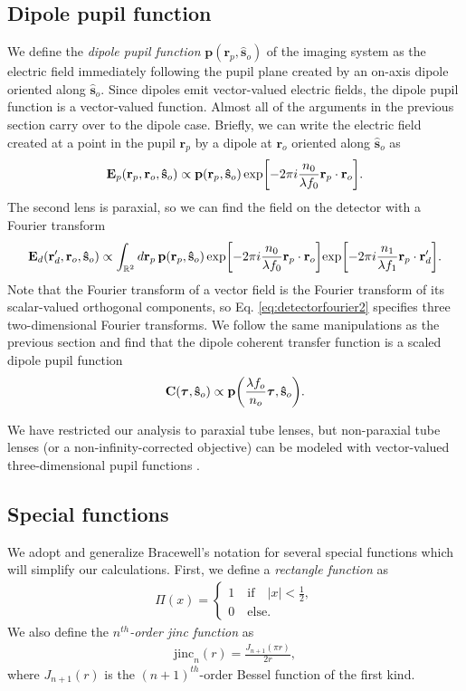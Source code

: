 \documentclass[]{osa-article}
\let\originalleft\left
\let\originalright\right
\renewcommand{\left}{\mathopen{}\mathclose\bgroup\originalleft}
\renewcommand{\right}{\aftergroup\egroup\originalright}
\providecommand{\mb}[1]{\mathbf{#1}}
\providecommand{\ro}{\mathbf{\mathbf{r}}_o}
\providecommand{\so}{\mathbf{\hat{s}}_o}
\providecommand{\rp}{\mathbf{r}_p}
\providecommand{\rd}{\mathbf{r}_d}
\providecommand{\mbb}[1]{\mathbb{#1}}
\providecommand{\bs}[1]{\boldsymbol{#1}}
\providecommand{\taup}{\bs{\tau}}
\begin{document}
\subsection{Dipole pupil function}
We define the \textit{dipole pupil function} $\mb{p}(\rp, \so)$ of the imaging
system as the electric field immediately following the pupil plane created by
an on-axis dipole oriented along $\so$. Since dipoles emit vector-valued
electric fields, the dipole pupil function is a vector-valued function. Almost
all of the arguments in the previous section carry over to the dipole case.
Briefly, we can write the electric field created at a point in the pupil
$\rp$ by a dipole at $\ro$ oriented along $\so$ as
 \begin{align}
   \mb{E}_p(\rp, \ro, \so) \propto \mb{p}(\rp, \so)\,\text{exp}\left[-2\pi i \frac{n_0}{\lambda f_0} \rp\cdot\ro \right]. \label{eq:pupil2}
 \end{align}
 The second lens is paraxial, so we can find the field on the detector with a
 Fourier transform
 \begin{align}
   \mb{E}_d(\rd', \ro, \so) \propto \int_{\mbb{R}^2}d\rp\, \mb{p}(\rp, \so)\,\text{exp}\left[-2\pi i \frac{n_0}{\lambda f_0} \rp\cdot\ro \right]\text{exp}\left[-2\pi i \frac{n_1}{\lambda f_1} \rp\cdot\rd' \right]. \label{eq:detectorfourier2}
\end{align}
Note that the Fourier transform of a vector field is the Fourier transform of
its scalar-valued orthogonal components, so Eq. \eqref{eq:detectorfourier2}
specifies three two-dimensional Fourier transforms. We follow the same
manipulations as the previous section and find that the dipole coherent transfer
function is a scaled dipole pupil function
\begin{align}
  \mb{C}(\taup, \so) \propto \mb{p}\left(\frac{\lambda f_o}{n_o}\taup, \so\right). \label{eq:monopupildip}
\end{align}

We have restricted our analysis to paraxial tube lenses, but non-paraxial tube
lenses (or a non-infinity-corrected objective) can be modeled with vector-valued
three-dimensional pupil functions \cite{sheppard1994, gu2000, arnison2002,
  foreman2011-2}.

\subsection{Special functions}
We adopt and generalize Bracewell's notation \cite{bracewell2004} for several
special functions which will simplify our calculations. First, we define a
\textit{rectangle function} as
\begin{align}
  \Pi(x) = 
  \begin{cases}
    1\quad \text{if}\quad |x| < \frac{1}{2},\\
    0\quad \text{else}.
  \end{cases}
\end{align}
We also define the \textit{$n^{th}$-order jinc function} as
\begin{align}
  \text{jinc}_n(r) = \frac{J_{n+1}(\pi r)}{2r},
\end{align}
where $J_{n+1}(r)$ is the $(n+1)^{th}$-order Bessel function of the first kind.
\end{document}
